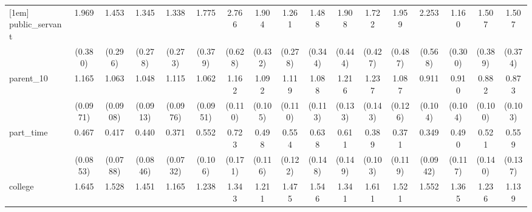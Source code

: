 {\begin{tabular}{l*{16}{c}}
[1em]
public\_servant      &       1.969\sym{***}&       1.453         &       1.345         &       1.338         &       1.775\sym{**} &       2.766\sym{***}&       1.904\sym{**} &       1.261         &       1.488         &       1.908\sym{**} &       1.722\sym{*}  &       1.959\sym{**} &       2.253\sym{**} &       1.160         &       1.507         &       1.507         \\
                    &     (0.380)         &     (0.296)         &     (0.278)         &     (0.273)         &     (0.379)         &     (0.628)         &     (0.432)         &     (0.278)         &     (0.344)         &     (0.444)         &     (0.427)         &     (0.487)         &     (0.568)         &     (0.300)         &     (0.389)         &     (0.374)         \\
[1em]
parent\_10           &       1.165         &       1.063         &       1.048         &       1.115         &       1.062         &       1.162         &       1.092         &       1.119         &       1.088         &       1.216         &       1.237         &       1.087         &       0.911         &       0.910         &       0.882         &       0.873         \\
                    &    (0.0971)         &    (0.0908)         &    (0.0913)         &    (0.0976)         &    (0.0951)         &     (0.110)         &     (0.105)         &     (0.110)         &     (0.113)         &     (0.133)         &     (0.143)         &     (0.126)         &     (0.104)         &     (0.104)         &     (0.100)         &     (0.103)         \\
[1em]
part\_time           &       0.467\sym{***}&       0.417\sym{***}&       0.440\sym{***}&       0.371\sym{***}&       0.552\sym{**} &       0.723         &       0.498\sym{**} &       0.554\sym{**} &       0.638         &       0.611\sym{*}  &       0.389\sym{***}&       0.371\sym{**} &       0.349\sym{***}&       0.490\sym{**} &       0.521\sym{*}  &       0.559\sym{*}  \\
                    &    (0.0853)         &    (0.0788)         &    (0.0846)         &    (0.0732)         &     (0.106)         &     (0.171)         &     (0.116)         &     (0.122)         &     (0.148)         &     (0.149)         &     (0.103)         &     (0.119)         &    (0.0942)         &     (0.117)         &     (0.140)         &     (0.137)         \\
[1em]
college             &       1.645\sym{***}&       1.528\sym{***}&       1.451\sym{***}&       1.165         &       1.238         &       1.343\sym{*}  &       1.211         &       1.475\sym{**} &       1.546\sym{**} &       1.341\sym{*}  &       1.611\sym{**} &       1.521\sym{**} &       1.552\sym{**} &       1.365\sym{*}  &       1.236         &       1.139         \\

\end{tabular}}
